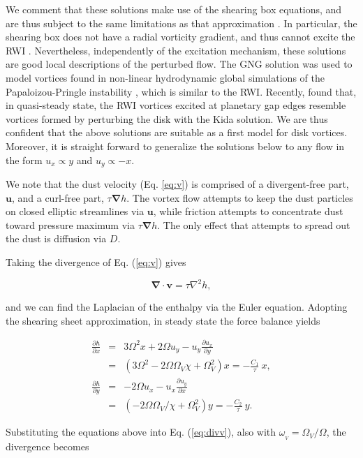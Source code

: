 \documentclass[apj]{emulateapj}
\newcommand{\pderiv}[2]{\frac{\partial #1}{\partial #2}}
\renewcommand{\v}[1]{{\boldsymbol{#1}}} %
\newcommand{\del}{\v{\nabla}}
\newcommand{\grad}{\del}
\newcommand{\Div}{\del\cdot}
\newcommand{\Laplace}{\nabla^2}
\newcommand{\Eq}[1]{Eq. (\ref{#1})}
\newcommand{\eq}[1]{\Eq{#1}}
\newcommand{\eqp}[1]{(Eq. \ref{#1})}
\newcommand{\beq}{\begin{equation}}
\newcommand{\eeq}{\end{equation}}
\begin{document}
We comment that these solutions make use of the shearing box
  equations, and are thus subject to the same limitations as that
  approximation \citep{Regev-Umurhan08}. In
  particular, the shearing box does not have a radial vorticity
  gradient, and thus cannot excite the RWI
  \citep{Tagger01}. Nevertheless, independently of the excitation
  mechanism, these solutions are good local descriptions of the perturbed
  flow. The GNG solution was used to model vortices
  found in non-linear hydrodynamic global simulations of the
  Papaloizou-Pringle instability \citep{Hawley87}, which is similar to
  the RWI. Recently, \cite{Lin-Papaloizou11a} found that, in
  quasi-steady state, the RWI vortices excited at planetary gap edges 
  resemble vortices formed by perturbing the disk with
  the Kida solution. We are thus confident that the above solutions are suitable
  as a first model for disk vortices.  Moreover, it is straight forward
  to generalize the solutions below to any flow in the form
  $u_x\propto y$ and $u_y\propto -x$.

We note that the dust velocity \eqp{eq:v} is comprised of a divergent-free part, $\v{u}$, and a
curl-free part, $\tau\grad{h}$. The vortex flow attempts to keep the
dust particles on closed elliptic streamlines via $\v{u}$, while friction
attempts to concentrate dust toward pressure maximum via $\tau\grad{h}$. The only effect that attempts to spread out the dust is diffusion
via $D$.  

Taking the divergence of
\eq{eq:v} gives 

\beq
\Div{\v{v}} = \tau \Laplace{h}, 
\label{eq:divv}
\eeq

\noindent and we can find the Laplacian of the enthalpy via the Euler
equation. Adopting the shearing sheet approximation, in steady state
the force balance yields  

\begin{eqnarray}
\pderiv{h}{x} &=& 3\varOmega^2 x + 2\varOmega u_y -
u_y\pderiv{u_x}{y} \nonumber \\
&=& \left(3\varOmega^2 - 2\varOmega\varOmega_V \chi + \varOmega_V^2\right) x
= -\frac{C_1}{\tau} \  x,  \label{eq:gas_mom1}\\
\pderiv{h}{y} &=& - 2\varOmega u_x -
u_x\pderiv{u_y}{x} \nonumber \\
&=& \left(-2\varOmega\varOmega_V/\chi + \varOmega_V^2\right) y = -\frac{C_2}{\tau} \  y.\label{eq:gas_mom2}
\end{eqnarray}

\noindent  Substituting the equations above into \eq{eq:divv}, also
with $\omega_{_V}=\varOmega_V/\varOmega$, the divergence becomes 
\end{document}
